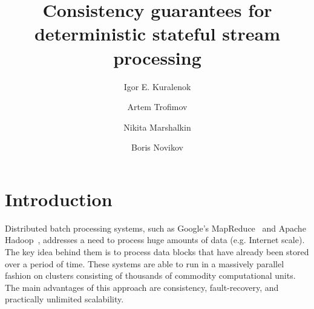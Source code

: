 \documentclass[sigconf]{acmart}
\theoremstyle{remark}
\begin{document}
\title {Consistency guarantees for deterministic stateful stream processing}


\author{Igor E. Kuralenok}

\author{Artem Trofimov}

\author{Nikita Marshalkin}

\author{Boris Novikov}




\begin{abstract}
\end {abstract}

\maketitle

\section {Introduction}
Distributed batch processing systems, such as Google's MapReduce~\cite{Dean:2008:MSD:1327452.1327492} and Apache Hadoop~\cite{hadoop2009hadoop}, addresses a need to process huge amounts of data (e.g. Internet scale). The key idea behind them is to process data blocks that have already been stored over a period of time. These systems are able to run in a massively parallel fashion on clusters consisting of thousands of commodity computational units. The main advantages of this approach are consistency, fault-recovery, and practically unlimited scalability.
\end{document}
